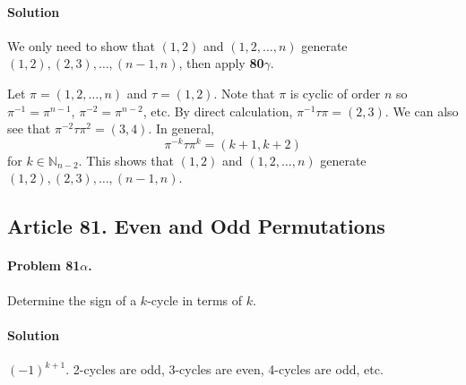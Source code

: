 \paragraph*{Solution}
We only need to show that $(1,2)$ and $(1,2, \dots, n)$ generate
$(1,2), (2,3), \dots, (n-1,n)$, then apply \textbf{80$\gamma$}.

Let $\pi = (1,2,\dots,n)$ and $\tau =(1,2)$. Note that $\pi$ is cyclic of order
$n$ so $\pi^{-1} = \pi^{n-1}$, $\pi^{-2} = \pi^{n-2}$, etc.
By direct calculation, $\pi^{-1}\tau\pi = (2,3)$. We can also see that
$\pi^{-2}\tau\pi^2 = (3,4)$. In general, $$\pi^{-k}\tau\pi^k = (k+1,k+2)$$ for
$k \in \mathbb{N}_{n-2}$. This shows that $(1,2)$ and $(1,2, \dots, n)$ generate
$(1,2), (2,3), \dots, (n-1,n)$.

\subsection{Article 81. Even and Odd Permutations}

\paragraph{Problem 81$\alpha$.}
Determine the sign of a $k$-cycle in terms of $k$.

\paragraph*{Solution}
$(-1)^{k+1}$. 2-cycles are odd, 3-cycles are even, 4-cycles are odd, etc.

